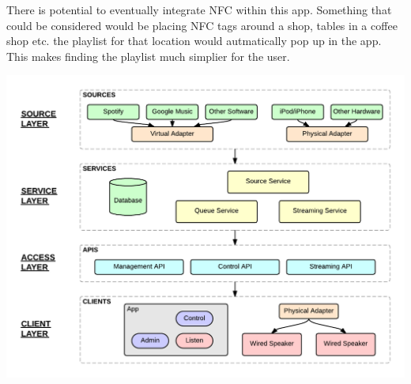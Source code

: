 There is potential to eventually integrate NFC within this app.  Something that could be considered would be placing NFC tags around a shop, tables in a coffee shop etc. the playlist for that location would autmatically pop up in the app. This makes finding the playlist much simplier for the user. 

\begin{minipage}{\linewidth}
  \centering
  \includegraphics[width=1\textwidth]{./img/sys-architecture.png}
  \label{sys-architecture}
\end{minipage}